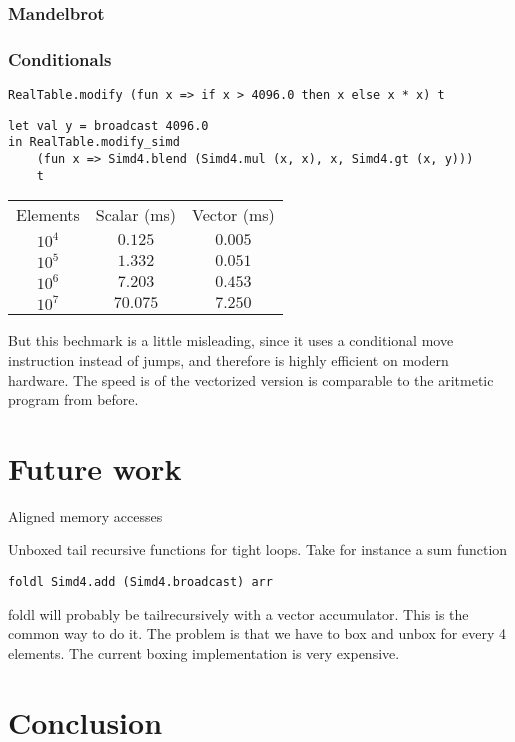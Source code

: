 \documentclass{article}
\begin{document}
\subsubsection{Mandelbrot}

\subsubsection{Conditionals}

\begin{lstlisting}
RealTable.modify (fun x => if x > 4096.0 then x else x * x) t
\end{lstlisting}

\begin{lstlisting}
let val y = broadcast 4096.0
in RealTable.modify_simd
    (fun x => Simd4.blend (Simd4.mul (x, x), x, Simd4.gt (x, y)))
    t
\end{lstlisting}

\begin{center}
\begin{tabular}{ c c c }
    Elements & Scalar (ms) & Vector (ms) \\
    $10^4$ & $0.125$ & $0.005$ \\
    $10^5$ & $1.332$ & $0.051$ \\
    $10^6$ & $7.203$ & $0.453$ \\
    $10^7$ & $70.075$ & $7.250$
\end{tabular}
\end{center}

But this bechmark is a little misleading, since it uses a conditional move instruction instead of jumps, and therefore is highly efficient on modern hardware. The speed is of the vectorized version is comparable to the aritmetic program from before.

\section{Future work}

Aligned memory accesses

Unboxed tail recursive functions for tight loops. Take for instance a sum function

\begin{lstlisting}
foldl Simd4.add (Simd4.broadcast) arr
\end{lstlisting}

foldl will probably be tailrecursively with a vector accumulator. This is the common way to do it. The problem is that we have to box and unbox for every 4 elements. The current boxing implementation is very expensive.

\section{Conclusion}




\end{document}
